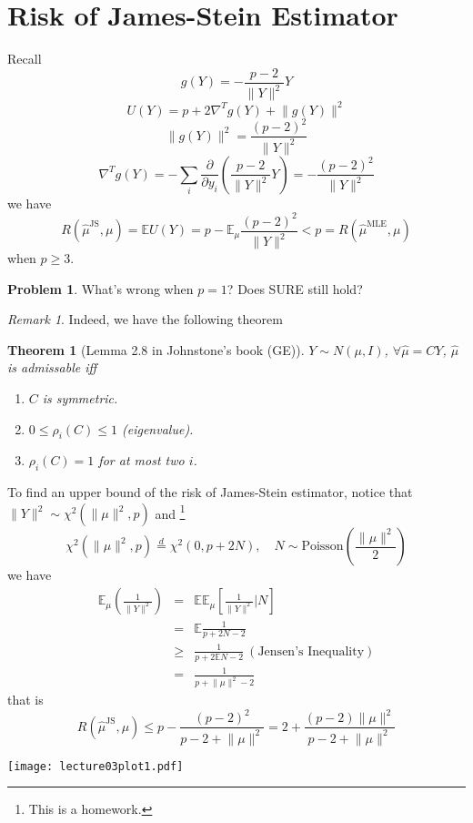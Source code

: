 \documentclass[twoside]{article}
\theoremstyle{plain}
\newtheorem{thm}{Theorem}[section]
\theoremstyle{definition}
\newtheorem*{prob}{Problem}
\theoremstyle{remark}
\newtheorem*{rem}{Remark}
\def\E{{\mathbb E}}
\def\E{{\mathbb E}}
\begin{document}
\section{Risk of James-Stein Estimator}
Recall
\[ g(Y) = - \frac{p-2}{\lVert Y \rVert^2} Y \]
\[ U(Y) = p + 2\nabla^Tg(Y) + \lVert g(Y) \rVert^2 \]
\[
	\lVert g(Y) \rVert^2 = \frac{(p-2)^2}{\lVert Y \rVert^2}
\]
\[
	\nabla^Tg(Y) = - \sum_i \frac{\partial}{\partial y_i} 
		\left( \frac{p-2}{\lVert Y \rVert^2} Y \right) 
		= - \frac{(p-2)^2}{\lVert Y \rVert^2}
\]
we have
\[
	R(\hat{\mu}^{\text{JS}},\mu) = \E U(Y) 
	= p - \E_\mu \frac{(p-2)^2}{\lVert Y \rVert^2}
	< p = R(\hat{\mu}^{\text{MLE}},\mu)
\]
when $p \ge 3$.
\begin{prob}
	What's wrong when $p=1$? Does SURE still hold?
\end{prob}
\begin{rem}
	Indeed, we have the following theorem
	\begin{thm}[Lemma 2.8 in Johnstone's book (GE)]
		$Y \sim N(\mu, I)$, $\forall \hat{\mu} = CY$,
		$\hat{\mu}$ is admissable iff
		\begin{enumerate}
			\item $C$ is symmetric.
			\item $0 \le \rho_i(C) \le 1$ (eigenvalue).
			\item $\rho_i(C) = 1$ for at most two $i$.
		\end{enumerate}
	\end{thm}
\end{rem}

To find an upper bound of the risk of James-Stein estimator, notice that
$\lVert Y \rVert^2 \sim \chi^2(\lVert\mu\rVert^2, p) $ and
\footnote{This is a homework.}
\[
	\chi^2(\lVert \mu \rVert^2 ,p ) \overset{d}{=} \chi^2(0,p+2N), 
		\quad N \sim \text{Poisson}\left(\frac{\lVert \mu \rVert^2}{2}\right)
\]
we have
\begin{eqnarray*}
\E_\mu\left(\frac{1}{\lVert Y \rVert^2}\right) &=& 
	\E \E_\mu \left[\frac{1}{\lVert Y \rVert^2} \Big\vert N \right] \\
	&=& \E \frac{1}{p+2N-2} \\
	&\ge& \frac{1}{p+2\E N -2}\  (\text{Jensen's Inequality}) \\
	&=& \frac{1}{p+\lVert \mu \rVert^2 - 2}
\end{eqnarray*}
that is
\[
	R(\hat{\mu}^{\text{JS}},\mu) 
	\le p - \frac{(p-2)^2}{p-2+\lVert \mu \rVert^2} 
	= 2 + \frac{(p-2)\lVert \mu \rVert^2}{p-2+\lVert\mu\rVert^2}
\]

\begin{center}
\texttt{[image: lecture03plot1.pdf]}
\end{center}
\end{document}
